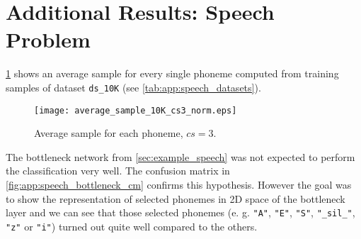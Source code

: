 
\section*{Additional Results: Speech Problem} \label{app:sec:additional_results_speech}
\cref{fig:app:speech_average_sample_cs3} shows an average sample for every single phoneme computed from training samples of dataset \texttt{ds\_10K} (see \cref{tab:app:speech_datasets}).

\begin{figure}[H]
\centering
\texttt{[image: average\_sample\_10K\_cs3\_norm.eps]}
\caption{Average sample for each phoneme, $ cs = 3 $.}
\label{fig:app:speech_average_sample_cs3}
\end{figure}

The bottleneck network from \cref{sec:example_speech} was not expected to perform the classification very well. The confusion matrix in \cref{fig:app:speech_bottleneck_cm} confirms this hypothesis. However the goal was to show the representation of selected phonemes in 2D space of the bottleneck layer and we can see that those selected phonemes (e. g. \texttt{"A"}, \texttt{"E"}, \texttt{"S"}, \texttt{"\_sil\_"}, \texttt{"z"} or \texttt{"i"}) turned out quite well compared to the others. 

